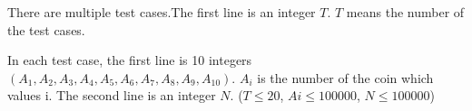 There are multiple test cases.The first line is an integer $T$. $T$ means the number of the test cases.

In each test case, the first line is 10 integers $(A_{1},A_{2},A_{3},A_{4},A_{5},A_{6},A_{7},A_{8},A_{9},A_{10})$. $A_{i}$ is the number of the coin which values i. The second line is an integer $N$. ($T \leq 20$, $Ai \leq 100000$, $N \leq 100000$) 